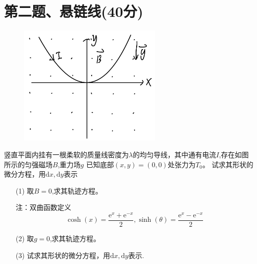 \documentclass{article}
\begin{document}
\section*{第二题、悬链线(40分)}
\begin{figure}
	\vspace{-15pt}    %
	\includegraphics[width=7cm]{img/2.1.jpeg}\\
	\vspace{-15pt}    %
	\vspace{-15pt}    %
\end{figure}
竖直平面内挂有一根柔软的质量线密度为$\lambda$的均匀导线，其中通有电流$I$,存在如图所示的匀强磁场$B$,重力场$g$
已知底部$(x,y)=(0,0)$处张力为$T_0$。
试求其形状的微分方程，用$\mathrm{d}x,\mathrm{d}y$表示
\begin{itemize}
\item[(1)]取$B=0$,求其轨迹方程。\par
    注：双曲函数定义
    $$
    \cosh(x)=\dfrac{\mathrm{e}^{x}+\mathrm{e}^{-x}}{2},\sinh(\theta)=\dfrac{\mathrm{e}^{x}-\mathrm{e}^{-x}}{2}
    $$
\item[(2)]取$g=0$,求其轨迹方程。
\item[(3)]试求其形状的微分方程，用$\mathrm{d}x,\mathrm{d}y$表示.  
\end{itemize}
\end{document}
